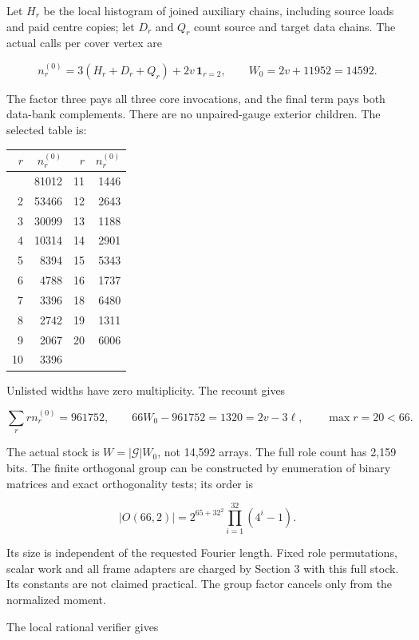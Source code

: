 \documentclass[
  11pt,
]{article}
\newcounter{none} %
\begin{document}
Let \(H_r\) be the local histogram of joined auxiliary chains, including
source loads and paid centre copies; let \(D_r\) and \(Q_r\) count
source and target data chains. The actual calls per cover vertex are

\[
n_r^{(0)}=3(H_r+D_r+Q_r)+2v\,\mathbf1_{r=2},
\qquad W_0=2v+11952=14592.
\]

The factor three pays all three core invocations, and the final term
pays both data-bank complements. There are no unpaired-gauge exterior
children. The selected table is:


{\def\LTcaptype{none} %
\begin{longtable}[]{@{}rrrr@{}}
\toprule\noalign{}
\(r\) & \(n_r^{(0)}\) & \(r\) & \(n_r^{(0)}\) \\
\midrule\noalign{}
\endhead
\bottomrule\noalign{}
\endlastfoot
1 & 81012 & 11 & 1446 \\
2 & 53466 & 12 & 2643 \\
3 & 30099 & 13 & 1188 \\
4 & 10314 & 14 & 2901 \\
5 & 8394 & 15 & 5343 \\
6 & 4788 & 16 & 1737 \\
7 & 3396 & 18 & 6480 \\
8 & 2742 & 19 & 1311 \\
9 & 2067 & 20 & 6006 \\
10 & 3396 & & \\
\end{longtable}
}

Unlisted widths have zero multiplicity. The recount gives

\[
\sum_r r n_r^{(0)}=961752,\qquad
66W_0-961752=1320=2v-3\ell,\qquad \max r=20<66.
\]

The actual stock is \(W=|\mathcal G|W_0\), not 14,592 arrays. The full
role count has 2,159 bits. The finite orthogonal group can be
constructed by enumeration of binary matrices and exact orthogonality
tests; its order is

\[
|O(66,2)|=2^{65+32^2}\prod_{i=1}^{32}(4^i-1).
\]

Its size is independent of the requested Fourier length. Fixed role
permutations, scalar work and all frame adapters are charged by Section
3 with this full stock. Its constants are not claimed practical. The
group factor cancels only from the normalized moment.

The local rational verifier gives
\end{document}
